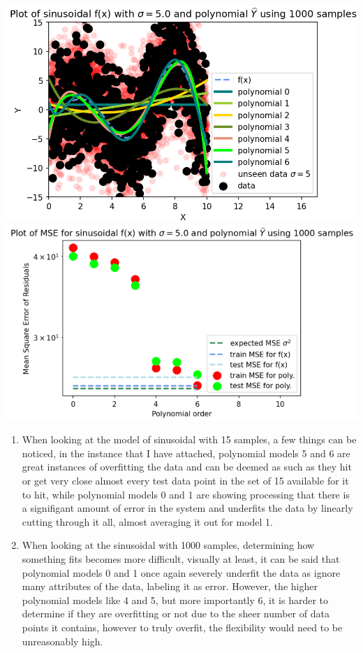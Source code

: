 \documentclass[12pt]{article}
\begin{document}
\begin{enumerate}[label=(\alph*)]
\begin{center}
              \includegraphics[width=1\textwidth]{sinusoidal-1000.png}
              \includegraphics[width=1\textwidth]{sinusoidal-MSE-1000.png}
          \end{center}
          \begin{enumerate}[label=(\roman*)]
              \item When looking at the model of sinusoidal with 15 samples, a few things can be noticed, in the instance that I have attached, polynomial models 5 and 6 are great instances of overfitting the data and can be deemed as such as they hit or get very close almost every test data point in the set of 15 available for it to hit, while polynomial models 0 and 1 are showing processing that there is a signifigant amount of error in the system and underfits the data by linearly cutting through it all, almost averaging it out for model 1.
              \item When looking at the sinusoidal with 1000 samples, determining how something fits becomes more difficult, visually at least, it can be said that polynomial models 0 and 1 once again severely underfit the data as ignore many attributes of the data, labeling it as error. However, the higher polynomial models like 4 and 5, but more importantly 6, it is harder to determine if they are overfitting or not due to the sheer number of data points it contains, however to truly overfit, the flexibility would need to be unreasonably high.

\end{enumerate}
\end{enumerate}
\end{document}
